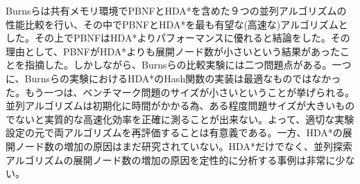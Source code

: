 \documentclass[uplatex]{jsarticle}
\begin{document}
Burnsらは共有メモリ環境でPBNFとHDA*を含めた９つの並列アルゴリズムの性能比較を行い、その中でPBNFとHDA*を最も有望な(高速な)アルゴリズムとした。その上でPBNFはHDA*よりパフォーマンスに優れると結論をした。その理由として、PBNFがHDA*よりも展開ノード数が小さいという結果があったことを指摘した。しかしながら、Burnsらの比較実験には二つ問題点がある。一つに、Burnsらの実験におけるHDA*のHash関数の実装は最適なものではなかった。もう一つは、ベンチマーク問題のサイズが小さいということが挙げられる。並列アルゴリズムは初期化に時間がかかる為、ある程度問題サイズが大きいものでないと実質的な高速化効率を正確に測ることが出来ない。よって、適切な実験設定の元で両アルゴリズムを再評価することは有意義である。一方、HDA*の展開ノード数の増加の原因はまだ研究されていない。HDA*だけでなく、並列探索アルゴリズムの展開ノード数の増加の原因を定性的に分析する事例は非常に少ない。
\end{document}
